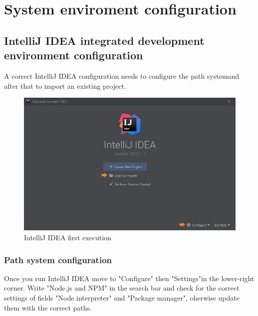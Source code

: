 \section{System enviroment configuration}
	\subsection{IntelliJ IDEA integrated development environment configuration}
A correct IntelliJ IDEA configuration needs to configure the path system\glo and after that to import an existing project.
	
	\begin{figure}[H]
		\centering
		\includegraphics[scale=0.70]{../Developer_manual/img/intellijidea_main.jpg}
		\caption{IntelliJ IDEA first execution}
	\end{figure}	

	

	\subsubsection{Path system configuration}
Once you run IntelliJ IDEA move to "Configure" then "Settings"in the lower-right corner. Write "Node.js and NPM" in the search bar and check for the correct settings of fields "Node interpreter" and "Package manager", oherwise update them with the correct paths. 

